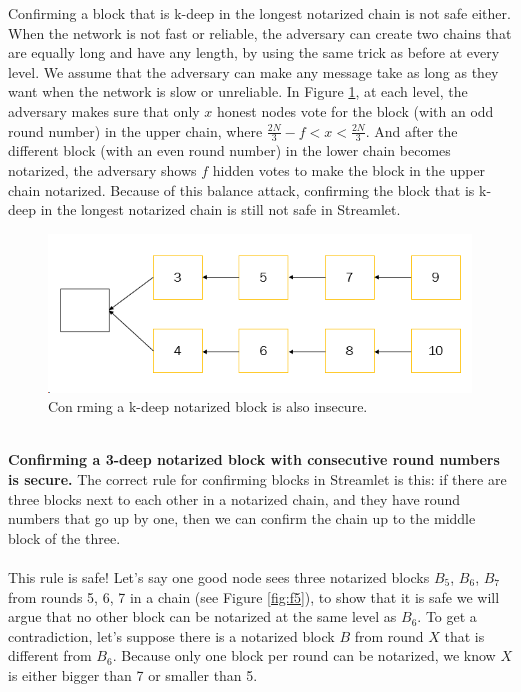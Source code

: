 \documentclass{report}
\begin{document}
Confirming a block that is k-deep in the longest notarized chain is not safe either. When the network is not fast or reliable, the adversary can create two chains that are equally long and have any length, by using the same trick as before at every level. We assume that the adversary can make any message take as long as they want when the network is slow or unreliable. In Figure \ref{fig:f4}, at each level, the adversary makes sure that only $x$ honest nodes vote for the block (with an odd round number) in the upper chain, where  $\frac{2N}{3}-f < x < \frac{2N}{3}$. And after the different block (with an even round number) in the lower chain becomes notarized, the adversary shows $f$ hidden votes to make the block in the upper chain notarized. Because of this balance attack, confirming the block that is k-deep in the longest notarized chain is still not safe in Streamlet.
\begin{figure}[h!]
	\centering
	\includegraphics[width=0.5\linewidth]{Fig/F4}
	\caption{Conrming a k-deep notarized block is also insecure.}
	\label{fig:f4}
\end{figure}\\
\textbf{Confirming a 3-deep notarized block with consecutive round numbers is secure.} The correct rule for confirming blocks in Streamlet is this: if there are three blocks next to each other in a notarized chain, and they have round numbers that go up by one, then we can confirm the chain up to the middle block of the three.\\\\
This rule is safe! Let’s say one good node sees three notarized blocks $B_5$, $B_6$, $B_7$ from rounds 5, 6, 7 in a chain (see Figure \ref{fig:f5}), to show that it is safe we will argue that no other block can be notarized at the same level as $B_6$. To get a contradiction, let’s suppose there is a notarized block $B$ from round $X$ that is different from $B_6$. Because only one block per round can be notarized, we know $X$ is either bigger than 7 or smaller than 5.
\end{document}
